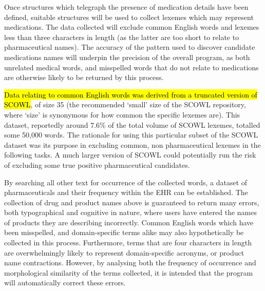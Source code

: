 Once structures which telegraph the presence of medication details have been defined, suitable structures will be used to collect lexemes which may represent medications.  The data collected will exclude common English words and lexemes less than three characters in length (as the latter are too short to relate to pharmaceutical names). The accuracy of the pattern used to discover candidate medications names will underpin the precision of the overall program, as both unrelated medical words, and misspelled words that do not relate to medications are otherwise likely to be returned by this process.

\hl{Data relating to common English words was derived from a truncated version of SCOWL}, of size 35 (the recommended `small' size of the SCOWL repository, where `size' is synonymous for how common the specific lexemes are)\cite{atkinson2004spell}. This dataset, reportedly around 7.6\% of the total volume of SCOWL lexemes, totalled some 50,000 words. The rationale for using this particular subset of the SCOWL dataset was its purpose in excluding common, non pharmaceutical lexemes in the following tasks. A much larger version of SCOWL could potentially run the risk of excluding some true positive pharmaceutical candidates.

By searching all other text for occurrence of the collected words, a dataset of pharmaceuticals and their frequency within the EHR can be established. The collection of drug and product names above is guaranteed to return many errors, both typographical and cognitive in nature, where users have entered the names of products they are describing incorrectly. Common English words which have been misspelled, and domain-specific terms alike may also hypothetically be collected in this process. Furthermore, terms that are four characters in length are overwhelmingly likely to represent domain-specific acronyms, or product name contractions. However, by analysing both the frequency of occurrence and morphological similarity of the terms collected, it is intended that the program will automatically correct these errors.
 








